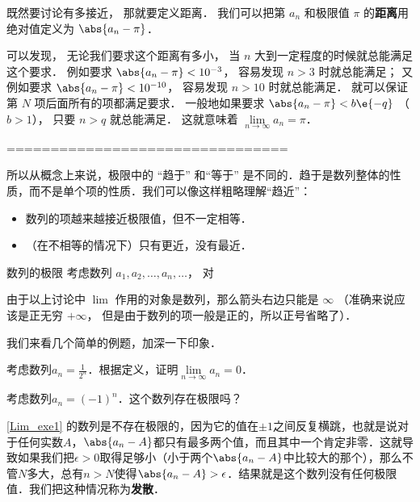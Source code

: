 既然要讨论有多接近， 那就要定义距离． 我们可以把第 $a_n$ 和极限值 $\pi$ 的\textbf{距离}用绝对值定义为 $\abs{a_n - \pi}$．

可以发现， 无论我们要求这个距离有多小， 当 $n$ 大到一定程度的时候就总能满足这个要求． 例如要求 $\abs{a_n - \pi} < 10^{-3}$， 容易发现 $n > 3$ 时就总能满足； 又例如要求 $\abs{a_n - \pi} < 10^{-10}$， 容易发现 $n > 10$ 时就总能满足． 就可以保证第 $N$ 项后面所有的项都满足要求． 一般地如果要求 $\abs{a_n - \pi} < b\e{-q}$ （$b > 1$）， 只要 $n > q$ 就总能满足． 这就意味着 $\lim\limits_{n \to \infty } a_n = \pi$． 


================================






所以从概念上来说，极限中的 “趋于” 和“等于” 是不同的．趋于是数列整体的性质，而不是单个项的性质．我们可以像这样粗略理解“趋近”：
\begin{itemize}
\item 数列的项越来越接近极限值，但不一定相等．
\item （在不相等的情况下）只有更近，没有最近．
\end{itemize}


\begin{definition}{数列的极限}\label{Lim_def2}
考虑数列 $a_1, a_2, \dots, a_n, \dots$， 对
\end{definition}
 


由于以上讨论中 $\lim$ 作用的对象是数列，那么箭头右边只能是 $\infty$ （准确来说应该是正无穷 $+\infty$， 但是由于数列的项一般是正的，所以正号省略了）．



我们来看几个简单的例题，加深一下印象．

\begin{exercise}{}
考虑数列$a_n=\frac{1}{2^n}$．根据定义，证明$\lim\limits_{n\to\infty}a_n=0$．
\end{exercise}

\begin{exercise}{}\label{Lim_exe1}
考虑数列$a_n=(-1)^n$．这个数列存在极限吗？
\end{exercise}

\autoref{Lim_exe1} 的数列是不存在极限的，因为它的值在$\pm 1$之间反复横跳，也就是说对于任何实数$A$，$\abs{a_n-A}$都只有最多两个值，而且其中一个肯定非零．这就导致如果我们把$\epsilon>0$取得足够小（小于两个$\abs{a_n-A}$中比较大的那个），那么不管$N$多大，总有$n>N$使得$\abs{a_n-A}>\epsilon$．结果就是这个数列没有任何极限值．我们把这种情况称为\textbf{发散}．

